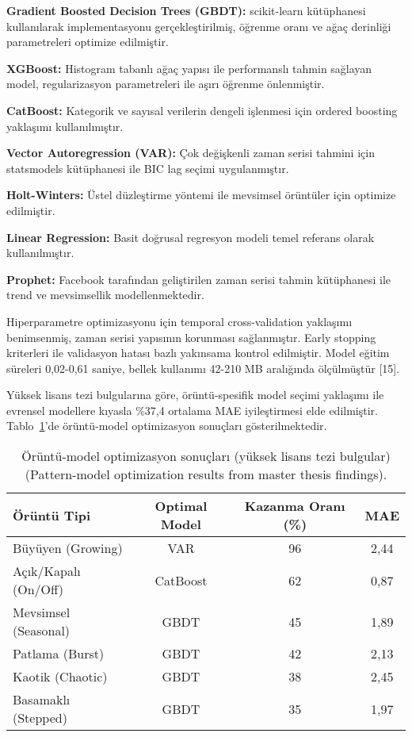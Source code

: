 \documentclass[12pt,a4paper]{article}
\begin{document}
\textbf{Gradient Boosted Decision Trees (GBDT):} scikit-learn kütüphanesi kullanılarak implementasyonu gerçekleştirilmiş, öğrenme oranı ve ağaç derinliği parametreleri optimize edilmiştir.

\textbf{XGBoost:} Histogram tabanlı ağaç yapısı ile performanslı tahmin sağlayan model, regularizasyon parametreleri ile aşırı öğrenme önlenmiştir.

\textbf{CatBoost:} Kategorik ve sayısal verilerin dengeli işlenmesi için ordered boosting yaklaşımı kullanılmıştır.

\textbf{Vector Autoregression (VAR):} Çok değişkenli zaman serisi tahmini için statsmodels kütüphanesi ile BIC lag seçimi uygulanmıştır.

\textbf{Holt-Winters:} Üstel düzleştirme yöntemi ile mevsimsel örüntüler için optimize edilmiştir.

\textbf{Linear Regression:} Basit doğrusal regresyon modeli temel referans olarak kullanılmıştır.

\textbf{Prophet:} Facebook tarafından geliştirilen zaman serisi tahmin kütüphanesi ile trend ve mevsimsellik modellenmektedir.

Hiperparametre optimizasyonu için temporal cross-validation yaklaşımı benimsenmiş, zaman serisi yapısının korunması sağlanmıştır. Early stopping kriterleri ile validasyon hatası bazlı yakınsama kontrol edilmiştir. Model eğitim süreleri 0,02-0,61 saniye, bellek kullanımı 42-210 MB aralığında ölçülmüştür [15].

Yüksek lisans tezi bulgularına göre, örüntü-spesifik model seçimi yaklaşımı ile evrensel modellere kıyasla \%37,4 ortalama MAE iyileştirmesi elde edilmiştir. Tablo~\ref{tab:pattern-model}'de örüntü-model optimizasyon sonuçları gösterilmektedir.

\begin{table}[h]
    \centering
    \caption{Örüntü-model optimizasyon sonuçları (yüksek lisans tezi bulgular) (Pattern-model optimization results from master thesis findings).}
    \label{tab:pattern-model}
    \begin{tabular}{@{}lccc@{}}
        \toprule
        Örüntü Tipi & Optimal Model & Kazanma Oranı (\%) & MAE \\
        \midrule
        Büyüyen (Growing) & VAR & 96 & 2,44 \\
        Açık/Kapalı (On/Off) & CatBoost & 62 & 0,87 \\
        Mevsimsel (Seasonal) & GBDT & 45 & 1,89 \\
        Patlama (Burst) & GBDT & 42 & 2,13 \\
        Kaotik (Chaotic) & GBDT & 38 & 2,45 \\
        Basamaklı (Stepped) & GBDT & 35 & 1,97 \\
        \bottomrule
    \end{tabular}
\end{table}
\end{document}
